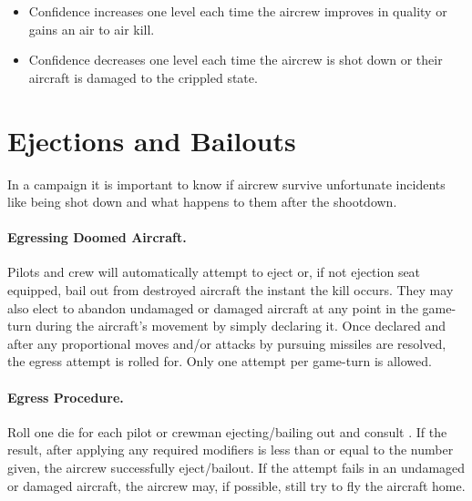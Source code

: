\begin{advancedrules}
\begin{itemize}
    \item Confidence increases one level each time the aircrew improves in quality or gains an air to air kill.

    \item Confidence decreases one level each time the aircrew is shot down or their aircraft is damaged to the crippled state. 

\end{itemize}


\section{Ejections and Bailouts}
\label{rule:ejections-and-bail-outs}
\label{rule:emergency-egress}


In a campaign it is important to know if aircrew survive unfortunate incidents like being shot down and what happens to them after the shootdown.

\paragraph{Egressing Doomed Aircraft.} Pilots and crew will automatically attempt to eject or, if not ejection seat equipped, bail out from destroyed aircraft the instant the kill occurs. They may also elect to abandon undamaged or damaged aircraft at any point in the game-turn during the aircraft's movement by simply declaring it.   Once declared and after any proportional moves and/or attacks by pursuing missiles are resolved, the egress attempt is rolled for. Only one attempt per game-turn is allowed.

\paragraph{Egress Procedure.} Roll one die for each pilot or crewman ejecting/bailing out and consult . If the result, after applying any required modifiers is less than or equal to the number given, the aircrew successfully eject/bailout.  If the attempt fails in an undamaged or damaged aircraft, the aircrew may, if possible, still try to fly the aircraft home.


\end{advancedrules}
